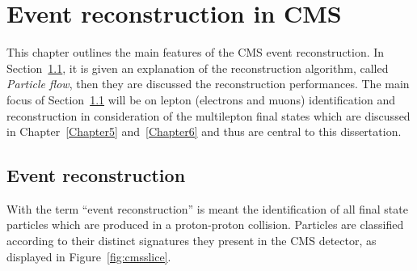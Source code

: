 \chapter{Event reconstruction in CMS} \label{Chapter2_5} 



This chapter outlines the main features of the CMS event
reconstruction. In Section~\ref{sec:reconstruction}, it is
given an explanation of the reconstruction algorithm, called
\emph{Particle flow}, then they are discussed the reconstruction performances. The main focus of Section~\ref{sec:reconstruction} will be on lepton (electrons and muons) identification and
reconstruction in consideration of the multilepton final states which are
discussed in Chapter~\ref{Chapter5} and~\ref{Chapter6} and thus are
central to this dissertation.


\section{Event reconstruction}\label{sec:reconstruction}
With the term ``event reconstruction'' is meant the identification of
all final state particles which are produced in a proton-proton
collision. Particles are classified according to their distinct
signatures they present in 
the CMS detector, as displayed in Figure~\ref{fig:cmsslice}.

